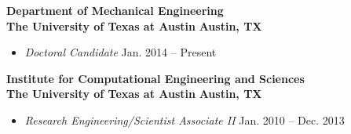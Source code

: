 \textbf{Department of Mechanical Engineering}\\
\textbf{The University of Texas at Austin} \hfill \textbf{Austin, TX}
%
\begin{itemize}
\item[] \textit{Doctoral Candidate} \hfill
	Jan. 2014 -- Present
\end{itemize}

\blankline

\textbf{Institute for Computational Engineering and Sciences}\\
\textbf{The University of Texas at Austin} \hfill \textbf{Austin, TX}
%
\begin{itemize}
\item[] \textit{Research Engineering/Scientist Associate II} \hfill
	Jan. 2010 -- Dec. 2013
\end{itemize}
